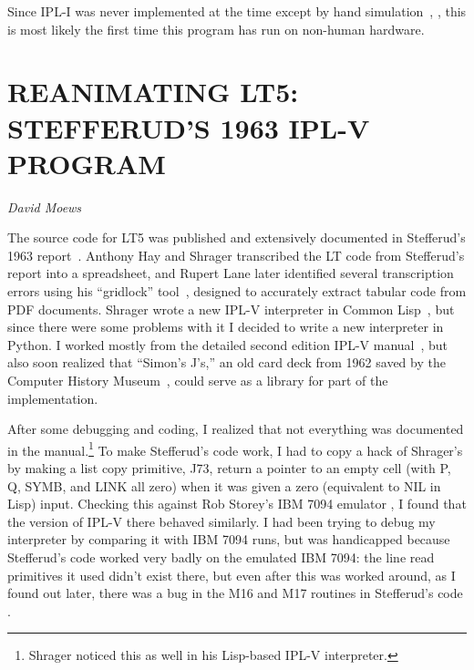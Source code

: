 \documentclass{IEEEcsmag}
\begin{document}
Since IPL-I was never implemented at the time except by hand
simulation~\cite[Ch.~13]{simon1996models}, \cite[p.~xx]{newell1964ipl}, this is most likely the first time this program has run on non-human hardware.


%
%

\section{REANIMATING LT5: STEFFERUD'S 1963 IPL-V PROGRAM}
\label{sec:lt5}

{\em David Moews}

%
%

The source code for LT5 was published and extensively documented
in Stefferud's 1963 report~\cite{stefferud1963lt}.  
Anthony Hay and Shrager transcribed the LT code from Stefferud's
report into a spreadsheet, and Rupert Lane later identified
several transcription errors using his ``gridlock''
tool~\cite{lane2024gridlock}, designed to accurately extract
tabular code from PDF documents.
Shrager wrote a new IPL-V interpreter in Common 
Lisp~\cite{shrager2026,shragerrepo}, but since there were some problems with
it I decided to write a new interpreter in Python.
I worked mostly from the detailed second edition IPL-V
manual~\cite{newell1964ipl}, but also soon realized that
``Simon's J's,'' an old card deck from 1962 saved by the Computer History
Museum~\cite{bochannek2012simonsjs}, could serve as a library for part of the
implementation.

After some debugging and coding, I realized that not
everything was documented in the manual.\footnote{Shrager noticed this as well in his Lisp-based IPL-V interpreter.}
To make Stefferud's code work, I had to copy a hack of  
Shrager's by making a list copy primitive, J73, return a pointer
to an empty cell (with P, Q, SYMB, and LINK all zero) when it was given
a zero (equivalent to NIL in Lisp) input.  Checking this against Rob 
Storey's IBM 7094 emulator \cite{ibsys}, I found that the version of IPL-V there
behaved similarly.  I had been trying to debug my interpreter by comparing
it with IBM 7094 runs, but was handicapped because Stefferud's code
worked very badly on the emulated IBM 7094: the line read primitives
it used didn't exist there, but even after this was worked around,
as I found out later, there was a bug in the M16 and M17 routines
in Stefferud's code \cite{moewsrepo2}.
\end{document}

